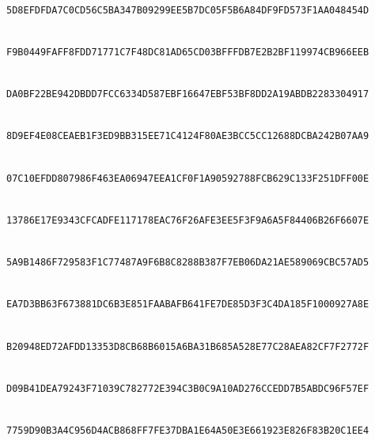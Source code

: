 \smallskip
\noindent{}\\
\nolinkurl{5D8EFDFDA7C0CD56C5BA347B09299EE5B7DC05F5B6A84DF9FD573F1AA048454D}\par
\smallskip
\noindent{}\\
\nolinkurl{F9B0449FAFF8FDD71771C7F48DC81AD65CD03BFFFDB7E2B2BF119974CB966EEB}\par
\smallskip
\noindent{}\\
\nolinkurl{DA0BF22BE942DBDD7FCC6334D587EBF16647EBF53BF8DD2A19ABDB2283304917}\par
\smallskip
\noindent{}\\
\nolinkurl{8D9EF4E08CEAEB1F3ED9BB315EE71C4124F80AE3BCC5CC12688DCBA242B07AA9}\par
\smallskip
\noindent{}\\
\nolinkurl{07C10EFDD807986F463EA06947EEA1CF0F1A90592788FCB629C133F251DFF00E}\par
\smallskip
\noindent{}\\
\nolinkurl{13786E17E9343CFCADFE117178EAC76F26AFE3EE5F3F9A6A5F84406B26F6607E}\par
\smallskip
\noindent{}\\
\nolinkurl{5A9B1486F729583F1C77487A9F6B8C8288B387F7EB06DA21AE589069CBC57AD5}\par
\smallskip
\noindent{}\\
\nolinkurl{EA7D3BB63F673881DC6B3E851FAABAFB641FE7DE85D3F3C4DA185F1000927A8E}\par
\smallskip
\noindent{}\\
\nolinkurl{B20948ED72AFDD13353D8CB68B6015A6BA31B685A528E77C28AEA82CF7F2772F}\par
\smallskip
\noindent{}\\
\nolinkurl{D09B41DEA79243F71039C782772E394C3B0C9A10AD276CCEDD7B5ABDC96F57EF}\par
\smallskip
\noindent{}\\
\nolinkurl{7759D90B3A4C956D4ACB868FF7FE37DBA1E64A50E3E661923E826F83B20C1EE4}\par
\smallskip
